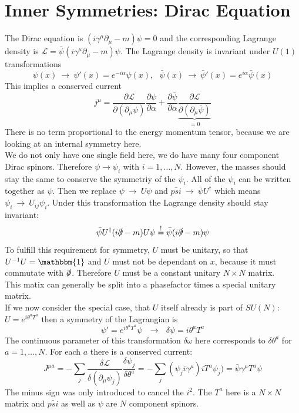 \documentclass{include/thesisclass}
\newcommand{\LL}{\mathcal{L}}
\newcommand{\df}{\rightarrow}
\newcommand{\ehm}{\mathbbm{1}}
\newcommand{\p}{\partial}
\newcommand{\soll}{\overset{!}{=}}
\begin{document}
\section{Inner Symmetries: Dirac Equation}
The Dirac equation is $(i \gamma^\mu \p_\mu - m ) \psi = 0$ and the corresponding Lagrange density is $\LL = \bar{\psi}(i \gamma^\mu \p_\mu - m ) \psi$. The Lagrange density is invariant under $U(1)$ transformations
\[ \psi(x) ~\df~ \psi'(x) = e^{-i\alpha}\psi(x), ~~~ \bar{\psi}(x) ~\df~ \bar{\psi}'(x) = e^{i\alpha} \bar{\psi}(x)\]
This implies a conserved current
\[ j^\mu = \frac{\p \LL}{\p ( \p_\mu \psi)} \frac{\p \psi}{\p \alpha} + \frac{\p \bar{\psi}}{\p \alpha} \underbrace{ \frac{\p \LL}{\p( \p_\mu \bar{\psi})}}_{ = 0} \]
There is no term proportional to the energy momentum tensor, because we are looking at an internal symmetry here.\\
We do not only have one single field here, we do have many four component Dirac spinors. Therefore $\psi \df \psi_i$ with $i = 1, \ldots, N$. However, the masses should stay the same to conserve the symmetriy of the $\psi_i$. All of the $\psi_i$ can be written together as $\psi$. Then we replace $\psi ~\df~ U\psi$ and $\bar{psi} ~\df~ \bar{\psi}U^\dagger$ which means $\psi_i ~\df~ U_{ij}\psi_i$. Under this transformation the Lagrange density should stay invariant:
\[ \bar{\psi} U^\dagger ( i \slashed{\p} - m ) U \psi \soll \bar{\psi}(i \slashed{\p} - m ) \psi\]
To fulfill this requirement for symmetry, $U$ must be unitary, so that $U^{-1}U = \ehm$ and $U$ must not be dependant on $x$, because it must commutate with $\slashed{\p}$. Therefore $U$ must be a constant unitary $N \times N$ matrix.\\
This matix can generally be split into a phasefactor times a special unitary matrix.\\
If we now consider the special case, that $U$ itself already is part of $SU(N)$: $U = e^{i \theta^a T^a}$ then a symmetry of the Lagrangian is
\[ \psi' = e^{i \theta^a T^a} \psi ~~~\df ~~~ \delta \psi = i \theta^a T^a\]
The continuous parameter of this transformation $\delta \omega$ here corresponds to $\delta \theta^a$ for $a = 1, \ldots, N$. For each $a$ there is a conserved current:
\[ J^{\mu a} = - \sum_j \frac{\delta \LL}{\delta( \p_\mu \psi_j)} \frac{\delta \psi_j}{\delta \theta^a} = - \sum _j ( \psi_j i \gamma^\mu) i T^a \psi_j) = \bar{\psi} \gamma^\mu T^a \psi\]
The minus sign was only introduced to cancel the $i^2$. The $T^a$ here is a $N \times N$ matrix and $\bar{psi}$ as well as $\psi$ are $N$ component spinors.\\
\end{document}

